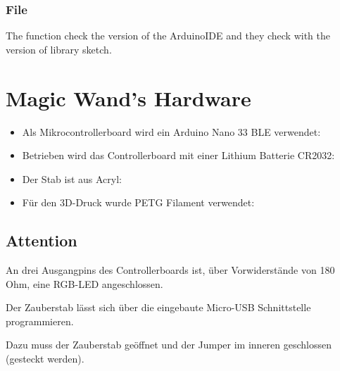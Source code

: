 \subsubsection{File }

The function check the version of the ArduinoIDE and they check with the version of library sketch. 

\begin{center}
    \label{Code:Version}
\end{center}




\section{Magic Wand's Hardware}


\begin{itemize}
    \item Als Mikrocontrollerboard wird ein Arduino Nano 33 BLE verwendet:
    
    \item Betrieben wird das Controllerboard mit einer Lithium Batterie CR2032: \cite{Energizer:2018}
    
    
    \item Der Stab ist aus Acryl: 
    
    \item Für den 3D-Druck wurde PETG Filament verwendet:
    
    
\end{itemize}


\subsection{Attention}

An drei Ausgangpins des Controllerboards ist, über Vorwiderstände von 180 Ohm, eine RGB-LED
angeschlossen.

Der Zauberstab lässt sich über die eingebaute Micro-USB Schnittstelle programmieren.

Dazu muss der Zauberstab geöffnet und der Jumper im inneren geschlossen (gesteckt werden).


